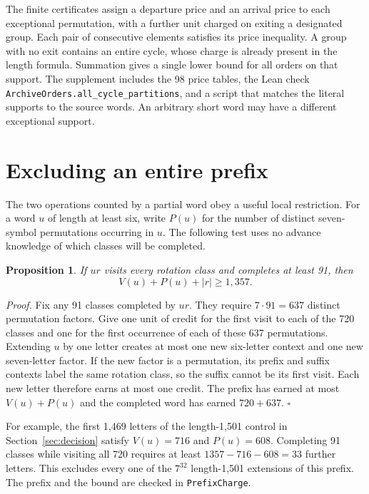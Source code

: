 \documentclass[11pt]{article}
\newtheorem{proposition}[theorem]{Proposition}
\newenvironment{proof}[1][Proof]{\par\smallskip\noindent\textit{#1.}\enspace}{\unskip\nobreak\hfill\ensuremath{\square}\par\smallskip}
\begin{document}
The finite certificates assign a departure price and an arrival price to each exceptional permutation, with a further unit charged on exiting a designated group. Each pair of consecutive elements satisfies its price inequality. A group with no exit contains an entire cycle, whose charge is already present in the length formula. Summation gives a single lower bound for all orders on that support. The supplement includes the 98 price tables, the Lean check \texttt{ArchiveOrders.all\_cycle\_partitions}, and a script that matches the literal supports to the source words. An arbitrary short word may have a different exceptional support.

\section{Excluding an entire prefix}
The two operations counted by a partial word obey a useful local restriction. For a word $u$ of length at least six, write $P(u)$ for the number of distinct seven-symbol permutations occurring in $u$. The following test uses no advance knowledge of which classes will be completed.
\begin{proposition}\label{prop:prefix}
If $ur$ visits every rotation class and completes at least 91, then
\[
                    V(u)+P(u)+|r|\ge 1{,}357.
\]
\end{proposition}
\begin{proof}
Fix any 91 classes completed by $ur$. They require $7\cdot91=637$ distinct permutation factors. Give one unit of credit for the first visit to each of the 720 classes and one for the first occurrence of each of these 637 permutations. Extending $u$ by one letter creates at most one new six-letter context and one new seven-letter factor. If the new factor is a permutation, its prefix and suffix contexts label the same rotation class, so the suffix cannot be its first visit. Each new letter therefore earns at most one credit. The prefix has earned at most $V(u)+P(u)$ and the completed word has earned $720+637$.
\end{proof}
For example, the first 1,469 letters of the length-1,501 control in Section~\ref{sec:decision} satisfy $V(u)=716$ and $P(u)=608$. Completing 91 classes while visiting all 720 requires at least $1357-716-608=33$ further letters. This excludes every one of the $7^{32}$ length-1,501 extensions of this prefix. The prefix and the bound are checked in \texttt{PrefixCharge}. 
\end{document}
